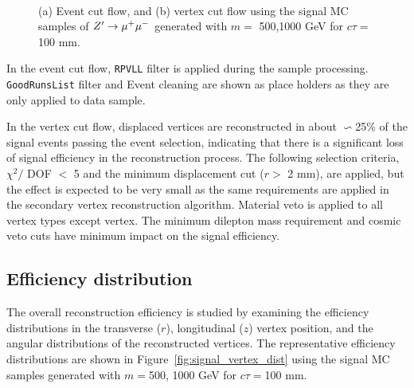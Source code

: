 \begin{figure}[!htb]
    \centering
     \\
    \caption{(a) Event cut flow, and (b) vertex cut flow using the signal MC samples of $Z'\rightarrow \mu^{+}\mu^{-}$ generated with $m =$ 500,1000 GeV for $c\tau= $ 100 mm.}
    \label{fig:signal_cutflow_MC_mumu}
\end{figure}

In the event cut flow, \texttt{RPVLL} filter is applied during the sample processing. \texttt{GoodRunsList} filter and Event cleaning are shown as place holders as they are only applied to data sample.

In the vertex cut flow, displaced vertices are reconstructed in about $\backsim$25$\%$ of the signal events passing the event selection, indicating that there is a significant loss of signal efficiency in the reconstruction process. The following selection criteria, $\chi^{2} /$ DOF $<$ 5 and the minimum displacement cut ($r > $ 2 mm), are applied, but the effect is expected to be very small as the same requirements are applied in the secondary vertex reconstruction algorithm. Material veto is applied to all vertex types except \mumu vertex. The minimum dilepton mass requirement and cosmic veto cuts have minimum impact on the signal efficiency.

\subsection{Efficiency distribution}
\label{sec:signal_vertex_distribution}
The overall reconstruction efficiency is studied by examining the efficiency distributions in the transverse ($r$), longitudinal ($z$) vertex position, and the angular distributions of the reconstructed vertices. The representative efficiency distributions are shown in Figure~\ref{fig:signal_vertex_dist} using the signal MC samples generated with $m =$500, 1000 GeV for $c\tau=$100 mm.

